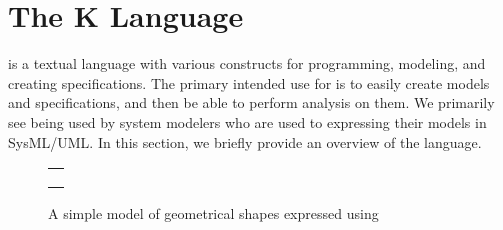 \section{The K Language}
\label{sec:k}

\Klang{} is a textual language with various constructs for
programming, modeling, and creating specifications. The primary
intended use for \Klang{} is to easily create models and
specifications, and then be able to perform analysis on them. We
primarily see \Klang{} being used by system modelers who are used to
expressing their models in SysML/UML. In this section, we briefly
provide an overview of the \Klang{} language.

\begin{figure}
\centering
\begin{tabular}{c}
\hline \\
 \\ \\
\hline
\end{tabular}
\caption{A simple model of geometrical shapes expressed using \Klang{}}
\label{fig:shapes}
\end{figure}


